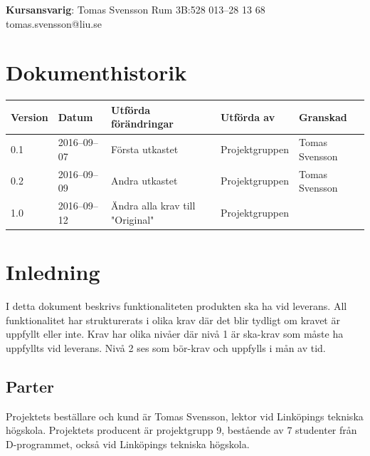 \documentclass[a4paper,titlepage,12pt]{article}
\begin{document}
\begin{center}
		\centering
		\textbf{Kursansvarig}: Tomas Svensson Rum 3B:528 013--28 13 68 tomas.svensson@liu.se

		\newpage
		\tableofcontents
		
		\newpage

		
		\newpage



		\section*{Dokumenthistorik}
		\begin{table}[h]
			\begin{tabular}[pos]{ l l l l l }
				\textbf{Version} & \textbf{Datum} & \textbf{Utförda förändringar} 
				& \textbf{Utförda av} & \textbf{Granskad} \\ \midrule

				0.1 & 2016--09--07 & Första utkastet & Projektgruppen & Tomas Svensson \\ \midrule
				0.2  & 2016--09--09 & Andra utkastet & Projektgruppen & Tomas Svensson \\ \midrule
				1.0  & 2016--09--12 & Ändra alla krav till "Original" & Projektgruppen & \\

			\end{tabular}
		\end{table}

	\end{center}


	\newpage

	\section{Inledning}
	I detta dokument beskrivs funktionaliteten produkten ska ha vid leverans. All funktionalitet har strukturerats i olika krav där det 
	blir tydligt om kravet är uppfyllt eller inte. Krav har olika nivåer där
	nivå 1 är ska-krav som måste ha uppfyllts vid leverans. Nivå 2 ses som bör-krav 
	och uppfylls i mån av tid.

	\subsection{Parter}
	Projektets beställare och kund är Tomas Svensson, lektor vid Linköpings tekniska högskola.
	Projektets producent är projektgrupp 9, bestående av 7 studenter från D-programmet, också vid 
	Linköpings tekniska högskola.
\end{document}
